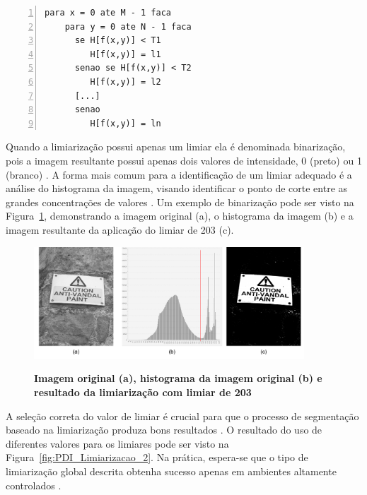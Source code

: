 \documentclass[12pt,oneside,a4paper,english,french,spanish,brazil,]{abntex2}
\begin{document}
\begin{lstlisting}[caption={Algoritmo para limiatrização}, label=alg:Threshold, numbers=left]
para x = 0 ate M - 1 faca
    para y = 0 ate N - 1 faca
      se H[f(x,y)] < T1
         H[f(x,y)] = l1
      senao se H[f(x,y)] < T2
         H[f(x,y)] = l2
      [...]
      senao 
         H[f(x,y)] = ln
\end{lstlisting}

Quando a limiarização possui apenas um limiar ela é denominada binarização, pois a imagem resultante possui apenas dois valores de intensidade, 0 (preto) ou 1 (branco) \cite{pedrini:2008}. A forma mais comum para a identificação de um limiar adequado é a análise do histograma da imagem, visando identificar o ponto de corte entre as grandes concentrações de valores \cite{gonzalez:2012}. Um exemplo de binarização pode ser visto na Figura~\ref{fig:PDI_Limiarizacao}, demonstrando a imagem original (a), o histograma da imagem (b) e a imagem resultante da aplicação do limiar de  203 (c).

\begin{figure}[ht]
\centering
\caption{\textbf{ Imagem original (a), histograma da imagem original (b) e resultado da limiarização com limiar de 203}}
\includegraphics[width=0.9\textwidth]{imagens/PDI_Limiarizacao.pdf}
\sourceAuthor
\label{fig:PDI_Limiarizacao}
\end{figure}

A seleção correta do valor de limiar é crucial para que o processo de segmentação baseado na limiarização produza bons resultados \cite{pedrini:2008}. O resultado do uso de diferentes valores para os limiares pode ser visto na Figura~\ref{fig:PDI_Limiarizacao_2}. Na prática, espera-se que o tipo de limiarização global descrita obtenha sucesso apenas em ambientes altamente controlados \cite{gonzalez:2012}.
\end{document}

